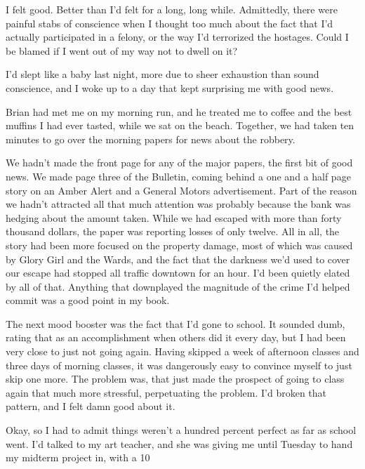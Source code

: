 I felt good.  Better than I'd felt for a long, long while.  Admittedly, there were painful stabs of conscience when I thought too much about the fact that I'd actually participated in a felony, or the way I'd terrorized the hostages.  Could I be blamed if I went out of my way not to dwell on it?



I'd slept like a baby last night, more due to sheer exhaustion than sound conscience, and I woke up to a day that kept surprising me with good news.



Brian had met me on my morning run, and he treated me to coffee and the best muffins I had ever tasted, while we sat on the beach.  Together, we had taken ten minutes to go over the morning papers for news about the robbery.



We hadn't made the front page for any of the major papers, the first bit of good news.  We made page three of the Bulletin, coming behind a one and a half page story on an Amber Alert and a General Motors advertisement.  Part of the reason we hadn't attracted all that much attention was probably because the bank was hedging about the amount taken.  While we had escaped with more than forty thousand dollars, the paper was reporting losses of only twelve.  All in all, the story had been more focused on the property damage, most of which was caused by Glory Girl and the Wards, and the fact that the darkness we'd used to cover our escape had stopped all traffic downtown for an hour.  I'd been quietly elated by all of that.  Anything that downplayed the magnitude of the crime I'd helped commit was a good point in my book.



The next mood booster was the fact that I'd gone to school.  It sounded dumb, rating that as an accomplishment when others did it every day, but I had been very close to just not going again.  Having skipped a week of afternoon classes and three days of morning classes, it was dangerously easy to convince myself to just skip one more.  The problem was, that just made the prospect of going to class again that much more stressful, perpetuating the problem.  I'd broken that pattern, and I felt damn good about it.



Okay, so I had to admit things weren't a hundred percent perfect as far as school went.  I'd talked to my art teacher, and she was giving me until Tuesday to hand my midterm project in, with a 10%



